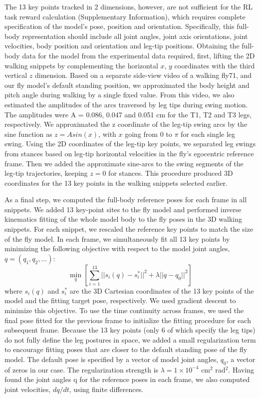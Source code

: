 \documentclass[sn-mathphys-num]{sn-jnl}%
\theoremstyle{thmstyleone}	%
\theoremstyle{thmstyletwo}	%
\theoremstyle{thmstylethree}	%
\begin{document}
The 13 key points tracked in 2 dimensions, however, are not sufficient for the RL task reward calculation (Supplementary Information), which requires complete specification of the model’s pose, position and orientation. 
Specifically, this full-body representation should include all joint angles, joint axis orientations, joint velocities, body position and orientation and leg-tip positions. 
Obtaining the full-body data for the model from the experimental data required, first, lifting the 2D walking snippets by complementing the horizontal $ x $, $ y $ coordinates with the third vertical $ z $ dimension.
Based on a separate side-view video of a walking fly71, and our fly model’s default standing position, we approximated the body height and pitch angle during walking by a single fixed value. 
From this video, we also estimated the amplitudes of the arcs traversed by leg tips during swing motion. 
The amplitudes were A = 0.086, 0.047 and 0.051 cm for the T1, T2 and T3 legs, respectively. 
We approximated the z coordinate of the leg-tip swing arcs by the sine function as $ z = A sin(x) $, with $ x $ going from 0 to $ \pi $ for each single leg swing.
Using the 2D coordinates of the leg-tip key points, we separated leg swings from stances based on leg-tip horizontal velocities in the fly’s egocentric reference frame. 
Then we added the approximate sine-arcs to the swing segments of the leg-tip trajectories, keeping $ z = 0 $ for stances.
This procedure produced 3D coordinates for the 13 key points in the walking snippets selected earlier.


As a final step, we computed the full-body reference poses for each frame in all snippets. 
We added 13 key-point sites to the fly model and performed inverse kinematics fitting of the whole model body to the fly poses in the 3D walking snippets. 
For each snippet, we rescaled the reference key points to match the size of the fly model. 
In each frame, we simultaneously fit all 13 key points by minimizing the following objective with respect to the model joint angles, $ q = (q_1, q_2, ...) $:
\begin{equation}\label{key}
	\min_{q} [ 
		\sum_{i=1}^{13} || s_i (q) - s_i^{*} ||^2
		+ \lambda || q - q_0 ||^2
	 ]
\end{equation}
%
where $ s_i(q) $ and $ s_i^{*} $ are the 3D Cartesian coordinates of the 13 key points of the model and the fitting target pose, respectively. 
We used gradient descent to minimize this objective. 
To use the time continuity across frames, we used the final pose fitted for the previous frame to initialize the fitting procedure for each subsequent frame. 
Because the 13 key points (only 6 of which specify the leg tips) do not fully define the leg postures in space, we added a small regularization term to encourage fitting poses that are closer to the default standing pose of the fly model. 
The default pose is specified by a vector of model joint angles, $ q_0 $, a vector of zeros in our case. 
The regularization strength is $ \lambda = 1 \times 10^{-4} $ cm$ ^2 $ rad$ ^2 $.
Having found the joint angles q for the reference poses in each frame, we also computed joint velocities, $ dq/dt $, using finite differences.
\end{document}
